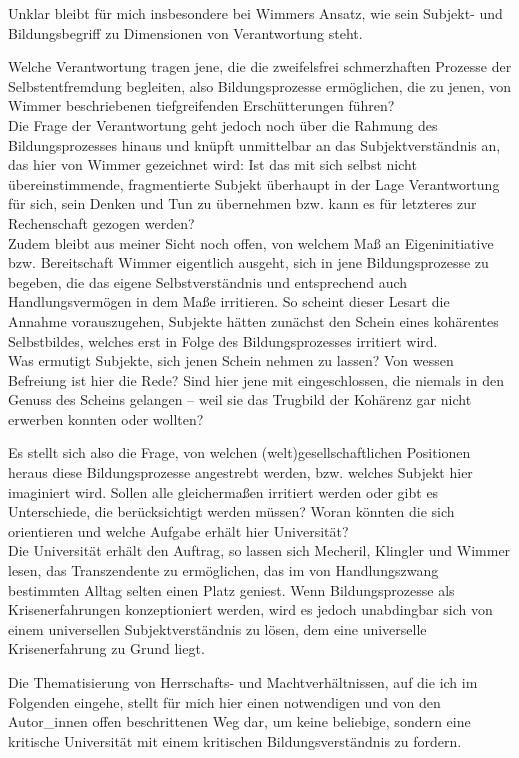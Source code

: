 Unklar bleibt für mich insbesondere bei Wimmers Ansatz, wie sein
Subjekt- und Bildungsbegriff zu Dimensionen von Verantwortung steht.

Welche
Verantwortung tragen jene, die die zweifelsfrei schmerzhaften Prozesse der
Selbstentfremdung begleiten, also Bildungsprozesse ermöglichen, die zu jenen,
von Wimmer beschriebenen tiefgreifenden Erschütterungen führen?\\
Die Frage der
Verantwortung geht jedoch noch über die Rahmung des Bildungsprozesses hinaus
und knüpft unmittelbar an das Subjektverständnis an, das hier von Wimmer
gezeichnet wird:
Ist das mit sich selbst nicht übereinstimmende, fragmentierte
Subjekt überhaupt in der Lage Verantwortung für sich, sein Denken und Tun zu
übernehmen bzw. kann es für letzteres zur Rechenschaft gezogen werden?\\
Zudem
bleibt aus meiner Sicht noch offen, von welchem Maß an Eigeninitiative bzw.
Bereitschaft Wimmer eigentlich ausgeht, sich in jene Bildungsprozesse zu
begeben, die das eigene Selbstverständnis und entsprechend auch
Handlungsvermögen in dem Maße irritieren. So scheint dieser Lesart die Annahme
vorauszugehen, Subjekte hätten zunächst den Schein eines kohärentes
Selbstbildes, welches erst in Folge des Bildungsprozesses irritiert wird.\\
Was
ermutigt Subjekte, sich jenen Schein nehmen zu lassen? Von wessen Befreiung ist
hier die Rede? Sind hier jene mit eingeschlossen, die niemals in den Genuss des
Scheins gelangen – weil sie das Trugbild der Kohärenz gar nicht erwerben
konnten oder wollten?

Es stellt sich also die Frage, von welchen
(welt)gesellschaftlichen Positionen heraus diese Bildungsprozesse angestrebt
werden, bzw. welches Subjekt hier imaginiert wird. Sollen alle gleichermaßen
irritiert werden oder gibt es Unterschiede, die berücksichtigt werden müssen?
Woran könnten die sich orientieren und welche Aufgabe erhält hier Universität?
\\

Die Universität erhält den Auftrag, so lassen sich Mecheril, Klingler und
Wimmer lesen, das Transzendente zu ermöglichen, das im von Handlungszwang
bestimmten Alltag selten einen Platz geniest. Wenn Bildungsprozesse als
Krisenerfahrungen konzeptioniert werden, wird es jedoch unabdingbar sich von
einem universellen Subjektverständnis zu lösen, dem eine universelle
Krisenerfahrung zu Grund liegt. 

Die Thematisierung von Herrschafts- und
Machtverhältnissen, auf die ich im Folgenden eingehe, stellt für mich hier
einen notwendigen und von den Autor\_innen offen beschrittenen Weg dar, um
keine beliebige, sondern eine kritische Universität mit einem kritischen
Bildungsverständnis zu fordern.

